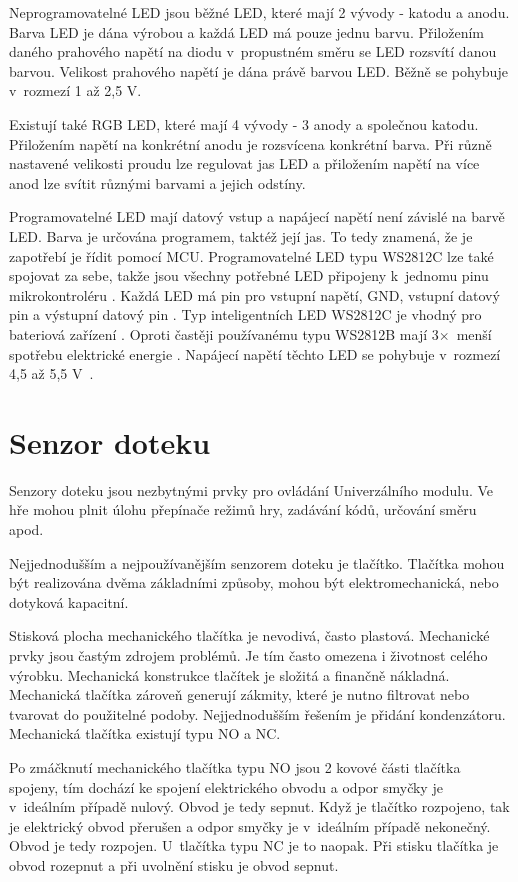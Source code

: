 Neprogramovatelné LED jsou běžné LED, které mají 2 vývody - katodu a anodu. Barva LED je dána výrobou a každá LED má pouze jednu 
barvu. Přiložením daného prahového napětí na diodu v~propustném směru se LED rozsvítí danou barvou. Velikost prahového napětí je dána
právě barvou LED. Běžně se pohybuje v~rozmezí 1 až 2,5 V.

Existují také RGB LED, které mají 4 vývody - 3 anody a společnou katodu. 
Přiložením napětí na konkrétní anodu je rozsvícena konkrétní barva. Při různě nastavené velikosti proudu lze regulovat jas LED 
a přiložením napětí na více anod lze svítit různými barvami a jejich odstíny. 

Programovatelné LED mají datový vstup a napájecí napětí není závislé na barvě LED. 
Barva je určována programem, taktéž její jas. To tedy znamená, že je zapotřebí je řídit 
pomocí MCU. Programovatelné LED typu WS2812C lze také spojovat za sebe, takže jsou všechny potřebné LED připojeny k~jednomu pinu 
mikrokontroléru \cite{WS2812C_dtsh}. Každá LED má pin pro vstupní napětí, GND, vstupní datový pin a výstupní datový pin \cite{WS2812C_dtsh}. Typ inteligentních 
LED WS2812C je vhodný pro bateriová zařízení \cite{WS2812C_dtsh}. Oproti častěji používanému typu WS2812B mají 3$\times$~menší spotřebu elektrické energie \cite{WS2812C_dtsh}. 
Napájecí napětí těchto LED se pohybuje v~rozmezí 4,5 až 5,5 V~\cite{WS2812C_dtsh}. 

\section{Senzor doteku}
Senzory doteku jsou nezbytnými prvky pro ovládání Univerzálního modulu. Ve hře mohou plnit úlohu přepínače režimů hry, zadávání kódů, 
určování směru apod. 

Nejjednodušším a nejpoužívanějším senzorem doteku je tlačítko. 
Tlačítka mohou být realizována dvěma základními způsoby, mohou být elektromechanická, nebo dotyková kapacitní. 

Stisková plocha mechanického tlačítka je nevodivá, často plastová. Mechanické prvky jsou častým zdrojem problémů. Je tím často omezena i 
životnost celého výrobku. Mechanická konstrukce tlačítek je složitá a finančně nákladná. Mechanická tlačítka zároveň generují zákmity, které 
je nutno filtrovat nebo tvarovat do použitelné podoby. Nejjednodušším řešením je přidání kondenzátoru. Mechanická tlačítka existují typu NO 
a NC. 

Po zmáčknutí mechanického tlačítka typu NO jsou 2 kovové části tlačítka spojeny, tím dochází ke spojení elektrického obvodu 
a odpor smyčky je v~ideálním případě nulový. Obvod je tedy sepnut. Když je tlačítko rozpojeno, tak je 
elektrický obvod přerušen a odpor smyčky je v~ideálním případě nekonečný. Obvod je tedy rozpojen. U~tlačítka typu NC je to naopak. Při stisku 
tlačítka je obvod rozepnut a při uvolnění stisku je obvod sepnut. 

